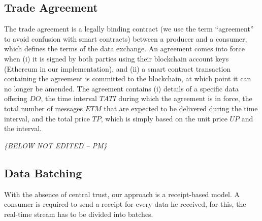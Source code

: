 \documentclass[letterpaper, 10 pt, conference]{ieeeconf}  %
\newcommand{\anote}[1]{{\leavevmode\smaller\itshape\color{red}\{#1\}}}
\newcommand{\up}{\ensuremath{\mathit{UP}}}
\newcommand{\doff}{\ensuremath{\mathit{DO}}}
\newcommand{\tati}{\ensuremath{\mathit{TATI}}}
\newcommand{\etm}{\ensuremath{\mathit{ETM}}}
\newcommand{\tp}{\ensuremath{\mathit{TP}}}
\begin{document}
%


\subsection{Trade Agreement} \label{sec:agreement}

The trade agreement is a legally binding contract (we use the term ``agreement'' to avoid confusion with smart contracts) between a producer and a consumer, which defines the terms of the data exchange.
An agreement comes into force when (i) it is signed by both parties using their blockchain account keys (Ethereum in our implementation), and (ii) a smart contract transaction containing the agreement is committed to the blockchain, at which point it can no longer be amended.
The agreement contains (i) details of a specific data offering \doff, the time interval \tati{} during which the agreement is in force, the total number of messages \etm{} that are expected to be delivered during the time interval, and the total price \tp, which is simply based on the unit price \up{} and the interval.



\anote{BELOW NOT EDITED  -- PM}

%
%
%

\subsection{Data Batching}
With the absence of central trust, our approach is a receipt-based model. A consumer is required to send a receipt for every data he received, for this, the real-time stream has to be divided into batches.
\end{document}
